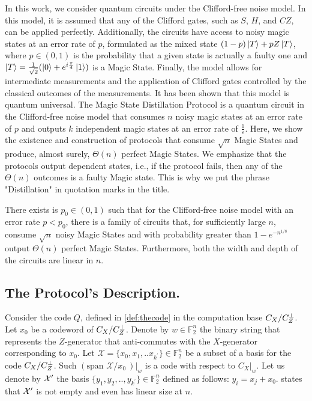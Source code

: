\documentclass[manuscript,screen,review]{acmart}
\begin{document}
In this work, we consider quantum circuits under the Clifford-free noise model. In this model, it is assumed that any of the Clifford gates, such as $S$, $H$, and $CZ$, can be applied perfectly. Additionally, the circuits have access to noisy magic states at an error rate of $p$, formulated as the mixed state $(1-p)\ket{T} + pZ\ket{T}$, where $p \in (0,1)$ is the probability that a given state is actually a faulty one and $\ket{T}= \frac{1}{\sqrt{2}}(\ket{0} + e^{i\frac{\pi}{4}}\ket{1})$ is a Magic State. Finally, the model allows for intermediate measurements and the application of Clifford gates controlled by the classical outcomes of the measurements. It has been shown that this model is quantum universal. The Magic State Distillation Protocol is a quantum circuit in the Clifford-free noise model that consumes $n$ noisy magic states at an error rate of $p$ and outputs $k$ independent magic states at an error rate of $\frac{1}{\varepsilon}$. Here, we show the existence and construction of protocols that consume $\sqrt{n}$ Magic States and produce, almost surely, $\Theta(n)$ perfect Magic States. We emphasize that the protocols output dependent states, i.e., if the protocol fails, then any of the $\Theta(n)$ outcomes is a faulty Magic state. This is why we put the phrase "Distillation" in quotation marks in the title.

\begin{theorem}
  \label{theorem:main}
There exists is $p_0 \in (0,1)$ such that for the Clifford-free noise model with an error rate $p < p_{0}$, there is a family of circuits that, for sufficiently large $n$, consume $\sqrt{n}$ noisy Magic States and with  probability greater than $1 - e^{-n^{1/8}}$ output $\Theta(n)$ perfect Magic States. Furthermore, both the width and depth of the circuits are linear in $n$.
\end{theorem}
\subsection{The Protocol's Description.} 
Consider the code $Q$, defined in \cref{def:thecode} in the computation base $C_{X}/C_{Z}^\perp$. Let $x_{0}$ be a codeword of $C_{X}/C_{Z}^\perp$. Denote by $w \in \mathbb{F}_{2}^{n}$ the binary string that represents the $Z$-generator that anti-commutes with the $X$-generator corresponding to $x_{0}$. Let $\mathcal{X} = \{x_{0}, x_{1}, .. x_{k^\prime}\} \in \mathbb{F}_{2}^{n}$ be a subset of a basis for the code $C_{X}/C_{Z}^\perp$. Such $\left(\text{span } \mathcal{X}/x_0 \ \right)|_{w}$ is a \trig code with respect to $C_{X}|_{w}$. Let us denote by $\mathcal{X}^\prime$ the basis $\{ y_{1}, y_{2}, .., y_{k^\prime} \} \in \mathbb{F}_{2}^{n}$ defined as follows: $ y_{i} = x_{j} + x_{0}$.
  states that $\mathcal{X}^\prime$ is not empty and even has linear size at $n$.
\end{document}
